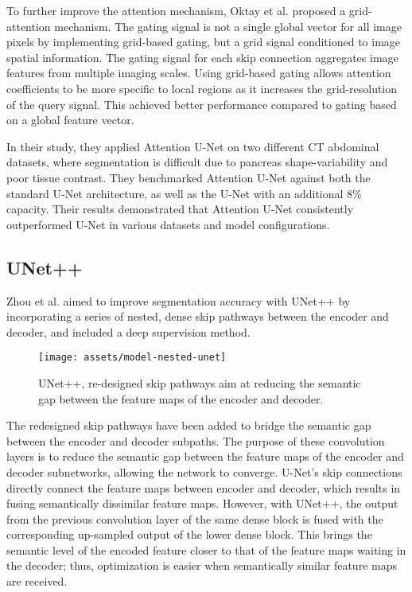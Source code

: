 \documentclass[conference]{IEEEtran}
\begin{document}
To further improve the attention mechanism, Oktay et al. proposed a grid-attention mechanism. The gating signal is not a single global vector for all image pixels by implementing grid-based gating, but a grid signal conditioned to image spatial information. The gating signal for each skip connection aggregates image features from multiple imaging scales. Using grid-based gating allows attention coefficients to be more specific to local regions as it increases the grid-resolution of the query signal. This achieved better performance compared to gating based on a global feature vector.

In their study, they applied Attention U-Net on two different CT abdominal datasets, where segmentation is difficult due to pancreas shape-variability and poor tissue contrast. They benchmarked Attention U-Net against both the standard U-Net architecture, as well as the U-Net with an additional 8\% capacity. Their results demonstrated that Attention U-Net consistently outperformed U-Net in various datasets and model configurations.

\subsection{UNet++}

Zhou et al. aimed to improve segmentation accuracy with UNet++ by incorporating a series of nested, dense skip pathways between the encoder and decoder, and included a deep supervision method.

\begin{figure}[h]
\centerline{\texttt{[image: assets/model-nested-unet]}}
\caption{UNet++, re-designed skip pathways aim at reducing the semantic gap between the feature maps of the encoder and decoder.}
\label{fig_unet_nested}
\end{figure}

The redesigned skip pathways have been added to bridge the semantic gap between the encoder and decoder subpaths. The purpose of these convolution layers is to reduce the semantic gap between the feature maps of the encoder and decoder subnetworks, allowing the network to converge. U-Net's skip connections directly connect the feature maps between encoder and decoder, which results in fusing semantically dissimilar feature maps. However, with UNet++, the output from the previous convolution layer of the same dense block is fused with the corresponding up-sampled output of the lower dense block. This brings the semantic level of the encoded feature closer to that of the feature maps waiting in the decoder; thus, optimization is easier when semantically similar feature maps are received.
\end{document}
